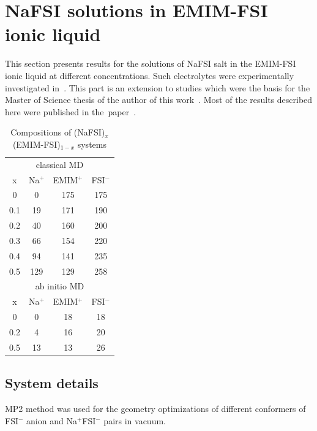 \section{NaFSI solutions in EMIM-FSI ionic liquid}
\label{section:emim-fsi}

This section presents results for the solutions of NaFSI salt in the EMIM-FSI ionic liquid at different concentrations. Such electrolytes were experimentally investigated in~\cite{na-fsi,na-il-1}. This part is an extension to studies which were the basis for the Master of Science thesis of the author of this work~\cite{msc-thesis}. Most of the results described here were published in the~paper~\cite{emim-fsi}.

\begin{table}[ht]
    \centering
    \caption{Compositions of (NaFSI)$_{x}$(EMIM-FSI)$_{1-x}$ systems}
    \label{tab:emim-fsi-compositions}
    \begin{tabular}{cccc}
      \toprule
      \multicolumn{4}{c}{classical MD} \\
      x & Na$^{+}$ & EMIM$^{+}$ & FSI$^{-}$ \\
      \midrule
      0 & 0 & 175 & 175 \\
      0.1 & 19 & 171 & 190 \\
      0.2 & 40 & 160 & 200 \\
      0.3 & 66 & 154 & 220 \\
      0.4 & 94 & 141 & 235 \\
      0.5 & 129 & 129 & 258 \\
      \midrule
      \multicolumn{4}{c}{ab initio MD} \\
      x & Na$^{+}$ & EMIM$^{+}$ & FSI$^{-}$ \\
      \midrule
      0 & 0 & 18 & 18 \\
      0.2 & 4 & 16 & 20 \\
      0.5 & 13 & 13 & 26 \\
      \bottomrule
    \end{tabular}    
\end{table}

\subsection{System details}
\label{subsection:emim-fsi-na-fsi-system-details}

MP2 method was used for the geometry optimizations of different conformers of FSI$^{-}$ anion and Na$^{+}$FSI$^{-}$ pairs in vacuum.

